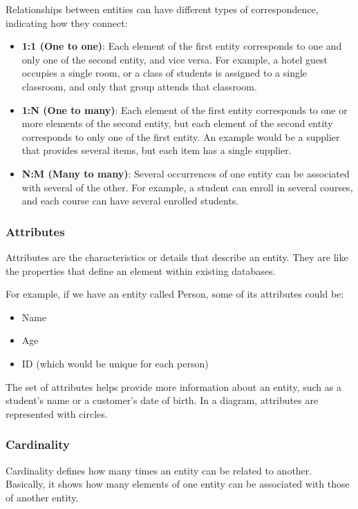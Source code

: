 \documentclass{article}
\begin{document}
Relationships between entities can have different types of correspondence, indicating how they connect:

\begin{itemize}
    \item \textbf{1:1 (One to one)}: Each element of the first entity corresponds to one and only one of the second entity, and vice versa. For example, a hotel guest occupies a single room, or a class of students is assigned to a single classroom, and only that group attends that classroom.
    \item \textbf{1:N (One to many)}: Each element of the first entity corresponds to one or more elements of the second entity, but each element of the second entity corresponds to only one of the first entity. An example would be a supplier that provides several items, but each item has a single supplier.
    \item \textbf{N:M (Many to many)}: Several occurrences of one entity can be associated with several of the other. For example, a student can enroll in several courses, and each course can have several enrolled students.
\end{itemize}

\subsubsection{Attributes}

Attributes are the characteristics or details that describe an entity. They are like the properties that define an element within existing databases.

For example, if we have an entity called Person, some of its attributes could be:

\begin{itemize}
    \item Name
    \item Age
    \item ID (which would be unique for each person)
\end{itemize}

The set of attributes helps provide more information about an entity, such as a student's name or a customer's date of birth. In a diagram, attributes are represented with circles.

\subsubsection{Cardinality}

Cardinality defines how many times an entity can be related to another. Basically, it shows how many elements of one entity can be associated with those of another entity.
\end{document}
